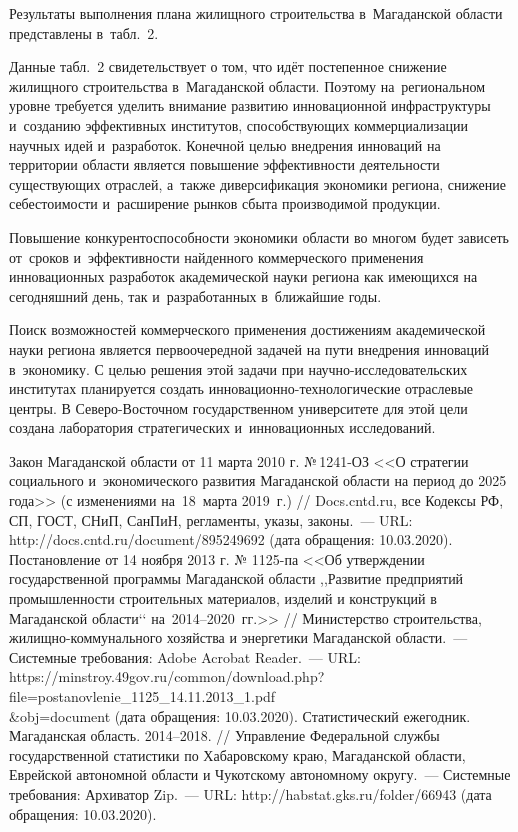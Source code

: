 Результаты выполнения плана жилищного строительства в~Магаданской области представлены в~табл.~2.



Данные табл.~2 свидетельствует о том, что идёт постепенное снижение жилищного строительства в~Магаданской области. Поэтому на~региональном уровне требуется уделить внимание развитию инновационной инфраструктуры и~созданию эффективных институтов, способствующих коммерциализации научных идей и~разработок. Конечной целью внедрения инноваций на территории области является повышение эффективности деятельности существующих отраслей, а~также диверсификация экономики региона, снижение себестоимости и~расширение рынков сбыта производимой продукции\enlargethispage{\baselineskip}.

Повышение конкурентоспособности экономики области во многом будет зависеть от~сроков и~эффективности найденного коммерческого применения инновационных разработок академической науки региона как имеющихся на сегодняшний день, так и~разработанных в~ближайшие годы.

Поиск возможностей коммерческого применения достижениям академической науки региона является первоочередной задачей на пути внедрения инноваций в~экономику. С целью решения этой задачи при научно-исследовательских институтах планируется создать ин\-но\-ва\-цион\-но-тех\-но\-ло\-ги\-чес\-кие отраслевые центры. В Северо-Восточном государственном университете для этой цели создана лаборатория стратегических и~инновационных исследований.

\begin{thebibliography}{99}
\bibitem{}Закон Магаданской области от 11 марта 2010 г. №\,1241-ОЗ <<О стратегии социального и~экономического развития Магаданской области на период до 2025 года>> (с изменениями на~18~марта 2019~г.) // Docs.cntd.ru, все Кодексы РФ, СП, ГОСТ, СНиП, СанПиН, регламенты, указы, законы.~--- URL: http://docs.cntd.ru/document/895249692 (дата обращения: 10.03.2020).
\bibitem{}Постановление от 14 ноября 2013 г. № 1125-па <<Об утверждении государственной программы Магаданской области ,,Развитие предприятий промышленности строительных материалов, изделий и конструкций в Магаданской области‘‘ на~2014--2020~гг.>> // Министерство строительства, жилищно-коммунального хозяйства и энергетики Магаданской области.~--- Системные требования: Adobe Acrobat Reader.~--- URL:
https://minstroy.49gov.ru/common/download.php?file=postanovlenie\_1125\_14.11.2013\_1.pdf\\\&obj=document (дата обращения: 10.03.2020).
\bibitem{}Статистический ежегодник. Магаданская область. 2014--2018. // Управление Федеральной службы государственной статистики по Хабаровскому краю, Магаданской области, Еврейской автономной области и Чукотскому автономному округу.~--- Системные требования: Архиватор Zip.~--- URL: http://habstat.gks.ru/folder/66943 (дата обращения: 10.03.2020).

\end{thebibliography}
